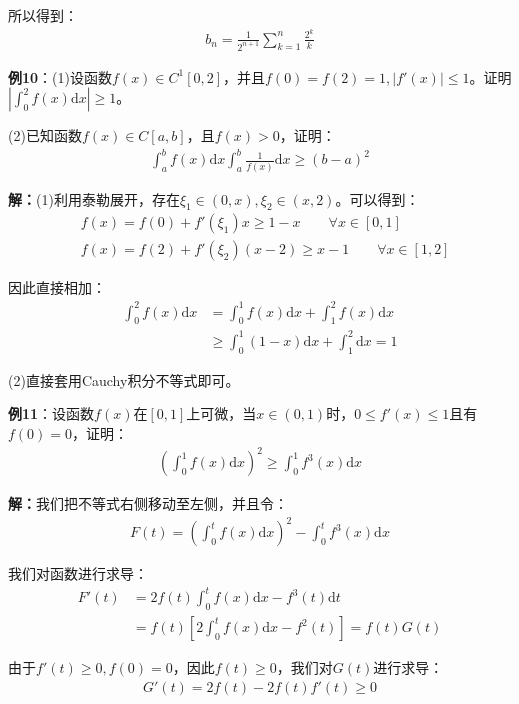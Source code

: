 \documentclass{ctexart}
\let\oldtextbf\textbf %
\renewcommand{\textbf}[1]{\textcolor{btex}{\oldtextbf{#1}}} %
\begin{document}
所以得到：
\begin{align*}
    b_n=\frac{1}{2^{n+1}}\sum_{k=1}^n\frac{2^k}{k}
\end{align*}

\textbf{例10}：(1)设函数$f(x)\in C^1[0,2]$，并且$f(0)=f(2)=1,|f'(x)|\leq 1$。证明$|\int_0^2f(x)\mathrm{d}x|\geq 1$。

(2)已知函数$f(x)\in C[a,b]$，且$f(x)>0$，证明：
\begin{align*}
    \int_a^b f(x)\mathrm{d}x\int_a^b\frac{1}{f(x)}\mathrm{d}x\geq (b-a)^2
\end{align*}

\textbf{解：}(1)利用泰勒展开，存在$\xi_1\in(0,x),\xi_2\in(x,2)$。可以得到：
\begin{align*}
&f(x)=f(0)+f'(\xi_1)x\geq 1-x\qquad \forall x\in[0,1]\\
&f(x)=f(2)+f'(\xi_2)(x-2)\geq x-1\qquad \forall x\in[1,2]
\end{align*}

因此直接相加：
\begin{align*}
    \int_0^2 f(x)\mathrm{d}x&=\int_0^1f(x)\mathrm{d}x+\int_1^2f(x)\mathrm{d}x\\
    &\geq \int_0^1 (1-x)\mathrm{d}x+\int_1^2\mathrm{d}x=1
\end{align*}

(2)直接套用Cauchy积分不等式即可。

\textbf{例11}：设函数$f(x)$在$[0,1]$上可微，当$x\in(0,1)$时，$0\leq f'(x)\leq 1$且有$f(0)=0$，证明：
\begin{align*}
    \left(\int_0^1 f(x)\mathrm{d}x\right)^2\geq \int_0^1 f^3(x)\mathrm{d}x
\end{align*}

\textbf{解：}我们把不等式右侧移动至左侧，并且令：
\begin{align*}
    F(t)=\left(\int_0^t f(x)\mathrm{d}x\right)^2-\int_0^t f^3(x)\mathrm{d}x
\end{align*}

我们对函数进行求导：
\begin{align*}
    F'(t)&=2f(t)\int_0^t f(x)\mathrm{d}x-f^3(t)\mathrm{d}t\\
    &=f(t)\left[2\int_0^t f(x)\mathrm{d}x-f^2(t)\right]=f(t)G(t)
\end{align*}

由于$f'(t)\geq 0,f(0)=0$，因此$f(t)\geq 0$，我们对$G(t)$进行求导：
\begin{align*}
    G'(t)=2f(t)-2f(t)f'(t)\geq 0
\end{align*}
\end{document}
